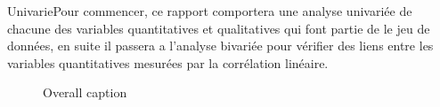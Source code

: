 
UnivariePour commencer, ce rapport comportera une analyse univariée de chacune des variables quantitatives et qualitatives qui font partie de le jeu de données, en suite il passera a l'analyse bivariée pour vérifier des liens entre les variables quantitatives mesurées par la corrélation linéaire.

\begin{figure}
    \centering
    \hfill
     \hfill
    \hfill
    \caption{Overall caption}
    \label{ref_label_overall}
\end{figure}
